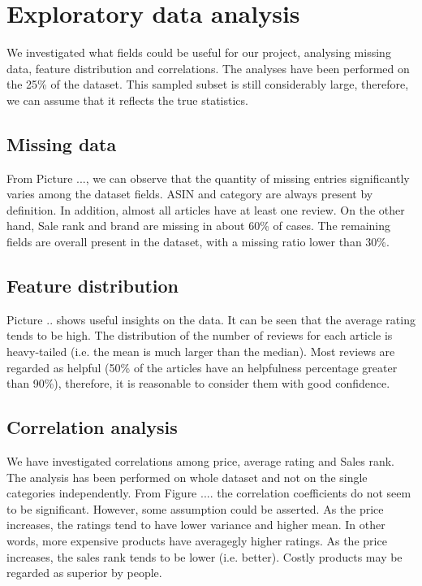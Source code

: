 \documentclass[11pt]{article}
\begin{document}
\section{Exploratory data analysis}
\label{sec:explodatanalysis}
We investigated what fields could be useful for our project, analysing missing data, feature distribution and correlations.
The analyses have been performed on the 25\% of the dataset. This sampled subset is still considerably large, therefore, we can assume that it reflects the true statistics. 
\subsection{Missing data}
From Picture ..., we can observe that the quantity of missing entries significantly varies among the dataset fields. ASIN and category are always present by definition. In addition, almost all articles have at least one review. On the other hand, Sale rank and brand are missing in about 60\% of cases. The remaining fields are overall present in the dataset, with a missing ratio lower than 30\%.
\subsection{Feature distribution}
Picture .. shows useful insights on the data.  It can be seen that the average rating tends to be high. The distribution of the number of reviews for each article is heavy-tailed (i.e. the mean is much larger than the median). Most reviews are regarded as helpful (50\% of the articles have an helpfulness percentage greater than 90\%), therefore, it is reasonable to consider them with good confidence.
\subsection{Correlation analysis}
We have investigated correlations among price, average rating and Sales rank. The analysis has been performed on whole dataset and not on the single categories independently. 
From Figure .... the correlation coefficients do not seem to be significant. However, some assumption could be asserted. As the price increases, the ratings tend to have lower variance and higher mean. In other words, more expensive products have averagegly higher ratings.
As the price increases, the sales rank tends to be lower (i.e. better). Costly products may be regarded as superior by people. 
\end{document}
